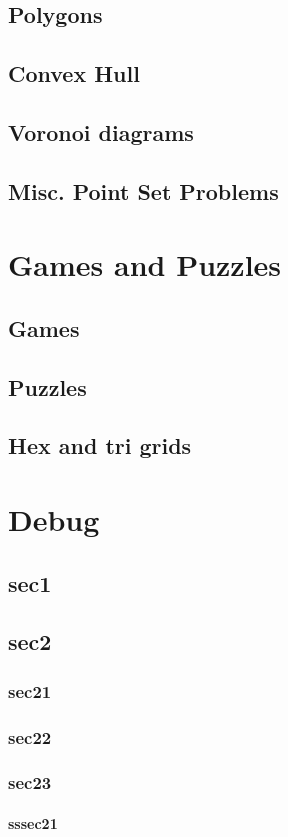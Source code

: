 \documentclass[10pt, a4paper, notitlepage]{report}
\begin{document}
\begin{multicols*}{3}
	\section{Polygons}
	\section{Convex Hull}
	\section{Voronoi diagrams}
	\section{Misc. Point Set Problems}
	
	\chapter{Games and Puzzles}
	\section{Games}
	\section{Puzzles}
	\section{Hex and tri grids}
	
	\chapter{Debug}
	
	\section{sec1}
	\section{sec2}
	\subsection{sec21}
	\subsection{sec22}
	\subsection{sec23}
	\subsubsection{sssec21}
	\end{multicols*}
\end{document}

